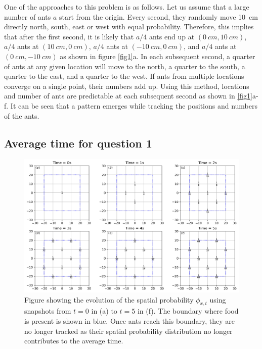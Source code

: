 \documentclass[11pt, a4paper]{article}
\begin{document}
One of the approaches to this problem is as follows. Let us assume that a large number of ants $a$ start from the origin. Every second, they randomly move \SI{10}{cm} directly north, south, east or west with equal probability. Therefore, this implies that after the first second, it is likely that $a/4$ ants end up at $(\SI{0}{cm}, \SI{10}{cm})$, $a/4$ ants at $(\SI{10}{cm}, \SI{0}{cm})$, $a/4$ ants at $(\SI{-10}{cm}, \SI{0}{cm})$, and $a/4$ ants at $(\SI{0}{cm}, \SI{-10}{cm})$ as shown in figure \ref{fig1}a. In each subsequent second, a quarter of ants at any given location will move to the north, a quarter to the south, a quarter to the east, and a quarter to the west. If ants from multiple locations converge on a single point, their numbers add up. Using this method, locations and number of ants are predictable at each subsequent second as shown in \ref{fig1}a-f. It can be seen that a pattern emerges while tracking the positions and numbers of the ants. 

\subsection{Average time for question 1}

\begin{figure}
    \includegraphics[width=\textwidth]{../Code/fig2.png}
    \caption{Figure showing the evolution of the spatial probability $\phi_{x,t}$ using snapshots from $t=0$ in (a) to $t=5$ in (f). The boundary where food is present is shown in blue. Once ants reach this boundary, they are no longer tracked as their spatial probability distribution no longer contributes to the average time.}
    \label{fig2}
\end{figure}
\end{document}
